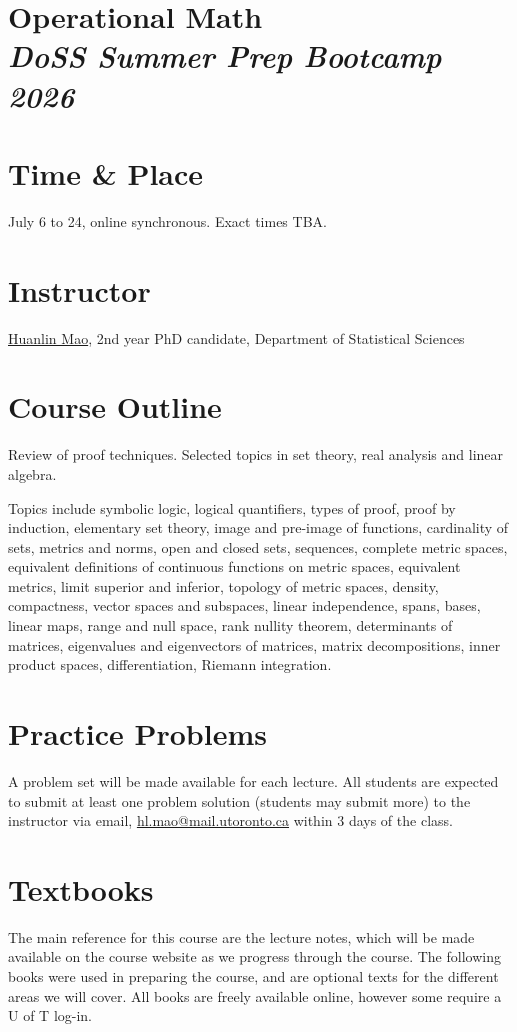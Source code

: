 \documentclass[12pt]{article}
\date{ }
\begin{document}
\section*{Operational Math\\  {\it{DoSS Summer Prep Bootcamp 2026}}}

\section{Time \& Place}
July 6 to 24, online synchronous. Exact times TBA.

\section{Instructor}
\href{mailto:hl.mao@mail.utoronto.ca}{Huanlin Mao}, 2nd year PhD candidate, Department of Statistical Sciences


\section{Course Outline}
Review of proof techniques. Selected topics in set theory, real analysis and linear algebra. 

\vspace{1em}

\noindent
Topics include symbolic logic, logical quantifiers, types of proof, proof by induction, elementary set theory, image and pre-image of functions, cardinality of sets, metrics and norms, open and closed sets, sequences, complete metric spaces, equivalent definitions of continuous functions on metric spaces, equivalent metrics, limit superior and inferior, topology of metric spaces, density, compactness, vector spaces and subspaces, linear independence, spans, bases, linear maps, range and null space, rank nullity theorem, determinants of matrices, eigenvalues and eigenvectors of matrices, matrix decompositions, inner product spaces, differentiation, Riemann integration.

\section{Practice Problems}
A problem set will be made available for each lecture. All students are expected to submit at least one problem solution (students may submit more) to the instructor via email, \href{mailto:hl.mao@mail.utoronto.ca}{hl.mao@mail.utoronto.ca} within 3 days of the class.

\section{Textbooks}
The main reference for this course are the lecture notes, which will be made available on the course website as we progress through the course. The following books were used in preparing the course, and are optional texts for the different areas we will cover. All books are freely available online, however some require a U of T log-in.
\end{document}
